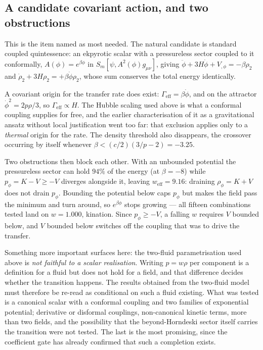 \documentclass[a4paper,11pt]{article}
\begin{document}
\subsection{A candidate covariant action, and two obstructions}

This is the item named as most needed. The natural candidate is standard coupled quintessence: an ekpyrotic scalar with a pressureless sector coupled to it conformally, $A(\phi)=e^{\beta\phi}$ in $S_m[\psi,A^2(\phi)g_{\mu\nu}]$, giving $\ddot\phi+3H\dot\phi+V_{,\phi}=-\beta\rho_2$ and $\dot\rho_2+3H\rho_2=+\beta\dot\phi\rho_2$, whose sum conserves the total energy identically.

A covariant origin for the transfer rate does exist: $\Gamma_{\mathrm{eff}}=\beta\dot\phi$, and on the attractor $\dot\phi^2=2p\rho/3$, so $\Gamma_{\mathrm{eff}}\propto H$. The Hubble scaling used above is what a conformal coupling supplies for free, and the earlier characterisation of it as a gravitational ansatz without local justification went too far: that exclusion applies only to a \emph{thermal} origin for the rate. The density threshold also disappears, the crossover occurring by itself whenever $\beta<(c/2)(3/p-2)=-3.25$.

Two obstructions then block each other. With an unbounded potential the pressureless sector can hold $94\%$ of the energy (at $\beta=-8$) while $p_\phi=K-V\ge-V$ diverges alongside it, leaving $w_{\mathrm{eff}}=9.16$: draining $\rho_\phi=K+V$ does not drain $p_\phi$. Bounding the potential below caps $p_\phi$ but makes the field pass the minimum and turn around, so $e^{\beta\phi}$ stops growing --- all fifteen combinations tested land on $w=1.000$, kination. Since $p_\phi\ge-V$, a falling $w$ requires $V$ bounded below, and $V$ bounded below switches off the coupling that was to drive the transfer.

Something more important surfaces here: the two-fluid parametrisation used above is \emph{not faithful to a scalar realisation}. Writing $p=w\rho$ per component is a definition for a fluid but does not hold for a field, and that difference decides whether the transition happens. The results obtained from the two-fluid model must therefore be re-read as conditional on such a fluid existing. What was tested is a canonical scalar with a conformal coupling and two families of exponential potential; derivative or disformal couplings, non-canonical kinetic terms, more than two fields, and the possibility that the beyond-Horndeski sector itself carries the transition were not tested. The last is the most promising, since the coefficient gate has already confirmed that such a completion exists.
\end{document}
